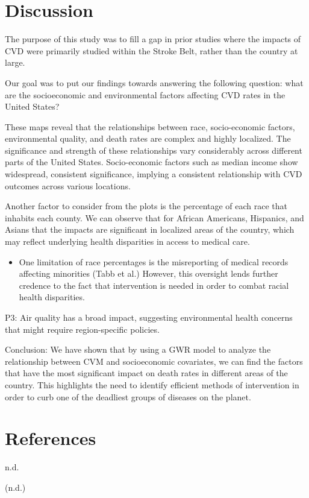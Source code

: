 \documentclass[
]{article}
\providecommand{\tightlist}{%
  \setlength{\itemsep}{0pt}\setlength{\parskip}{0pt}}\usepackage{longtable,booktabs,array}
\newlength{\cslhangindent}
\newenvironment{CSLReferences}[2] %
 {\begin{list}{}{%
  \setlength{\itemindent}{0pt}
  \setlength{\leftmargin}{0pt}
  \setlength{\parsep}{0pt}
  \ifodd #1
   \setlength{\leftmargin}{\cslhangindent}
   \setlength{\itemindent}{-1\cslhangindent}
  \fi
  \setlength{\itemsep}{#2\baselineskip}}}
 {\end{list}}
\begin{document}
\section{Discussion}\label{discussion}

The purpose of this study was to fill a gap in prior studies where the
impacts of CVD were primarily studied within the Stroke Belt, rather
than the country at large.

Our goal was to put our findings towards answering the following
question: what are the socioeconomic and environmental factors affecting
CVD rates in the United States?

These maps reveal that the relationships between race, socio-economic
factors, environmental quality, and death rates are complex and highly
localized. The significance and strength of these relationships vary
considerably across different parts of the United States. Socio-economic
factors such as median income show widespread, consistent significance,
implying a consistent relationship with CVD outcomes across various
locations.

Another factor to consider from the plots is the percentage of each race
that inhabits each county. We can observe that for African Americans,
Hispanics, and Asians that the impacts are significant in localized
areas of the country, which may reflect underlying health disparities in
access to medical care.

\begin{itemize}
\tightlist
\item
  One limitation of race percentages is the misreporting of medical
  records affecting minorities (Tabb et al.) However, this oversight
  lends further credence to the fact that intervention is needed in
  order to combat racial health disparities.
\end{itemize}

P3: Air quality has a broad impact, suggesting environmental health
concerns that might require region-specific policies.~

Conclusion: We have shown that by using a GWR model to analyze the
relationship between CVM and socioeconomic covariates, we can find the
factors that have the most significant impact on death rates in
different areas of the country. This highlights the need to identify
efficient methods of intervention in order to curb one of the deadliest
groups of diseases on the planet.

\newpage{}

\section*{References}\label{references}

\label{refs}
\begin{CSLReferences}{1}{0}
n.d.

\end{CSLReferences}

(n.d.)
\end{document}
